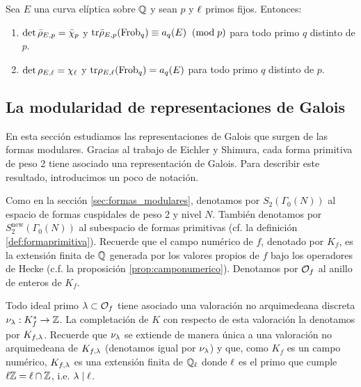 \begin{cor}\label{cor:det_de_rhop}
  Sea $E$ una curva el\'iptica sobre $\mathbb{Q}$ y sean $p$ y $\ell$ primos fijos. Entonces:
  \begin{enumerate}
  \item $\det\bar{\rho}_{E,p}=\bar{\chi}_p$ y $\mathrm{tr}\bar{\rho}_{E,p}(\mathrm{Frob}_q)\equiv a_q(E)\;\;(\mathrm{mod}\; p)$ para todo primo $q$ distinto de $p$.
    \item $\det\rho_{E,\ell}=\chi_{\ell}$ y $\mathrm{tr}\rho_{E,\ell}(\mathrm{Frob}_q)=a_q(E)$ para todo primo $q$ distinto de $p$.
  \end{enumerate}
\end{cor}

\subsection{La modularidad de representaciones de Galois}%

En esta secci\'on estudiamos las representaciones de Galois que surgen de las formas modulares. Gracias al trabajo de Eichler y Shimura, cada forma primitiva de peso 2 tiene asociado una representaci\'on de Galois. Para describir este resultado, introducimos un poco de notación.

Como en la secci\'on \ref{sec:formas_modulares}, denotamos por $S_2(\Gamma_0(N))$ al espacio de formas cuspidales de peso 2 y nivel $N$. También denotamos por $S^{\mathrm{new}}_2(\Gamma_0(N))$ al subespacio de formas primitivas (cf. la definici\'on \ref{def:formaprimitiva}). Recuerde que el campo num\'erico de $f$, denotado por $K_f$, es la extensi\'on finita de $\mathbb{Q}$ generada por los valores propios de $f$ bajo los operadores de Hecke (c.f. la proposici\'on \ref{prop:camponumerico}). Denotamos por $\mathcal{O}_f$ al anillo de enteros de $K_f$.

Todo ideal primo $\lambda\subset\mathcal{O}_f$ tiene asociado una valoración no arquimedeana discreta $\nu_\lambda:K_f^*\rightarrow\mathbb{Z}$. La completación de $K$ con respecto de esta valoración la denotamos por $K_{f,\lambda}$. Recuerde que $\nu_\lambda$ se extiende de manera única a una valoración no arquimedeana de $K_{f,\lambda}$ (denotamos igual por $\nu_\lambda$) y que, como $K_f$ es un campo numérico, $K_{f,\lambda}$ es una extensión finita de $\mathbb{Q}_\ell$ donde $\ell$ es el primo que cumple $\ell\mathbb{Z}=\ell\cap\mathbb{Z}$, i.e. $\lambda\mid\ell$.

